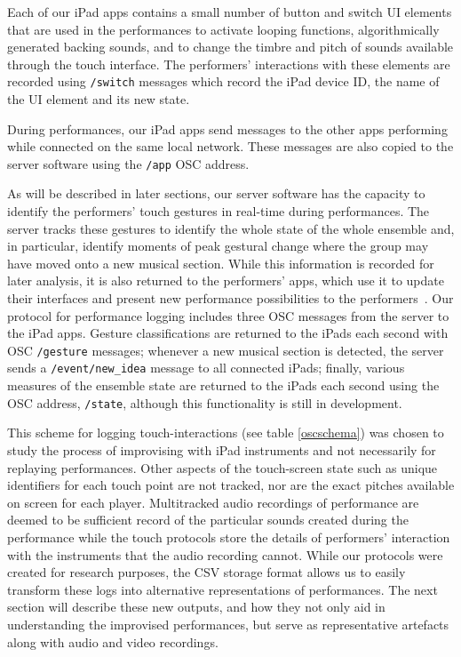 \documentclass[graybox]{svmult}
\begin{document}
Each of our iPad apps contains a small number of button and switch UI
elements that are used in the performances to activate looping
functions, algorithmically generated backing sounds, and to change the
timbre and pitch of sounds available through the touch interface. The
performers' interactions with these elements are recorded using
\texttt{/switch} messages which record the iPad device ID,
the name of the UI element and its new state.

During performances, our iPad apps send messages to the other apps
performing while connected on the same local network. These messages
are also copied to the server software using the
\texttt{/app} OSC address.

As will be described in later sections, our server software has the
capacity to identify the performers' touch gestures in real-time
during performances. The server tracks these gestures to identify the
whole state of the whole ensemble and, in particular, identify moments
of peak gestural change where the group may have moved onto a new
musical section. While this information is recorded for later
analysis, it is also returned to the performers' apps, which use it to
update their interfaces and present new performance possibilities to
the performers~\cite{Martin:2015jk}. Our protocol for performance
logging includes three OSC messages from the server to the iPad apps.
Gesture classifications are returned to the iPads each second with OSC
\texttt{/gesture} messages; whenever a new musical section is
detected, the server sends a \texttt{/event/new\_idea} message to all
connected iPads; finally, various measures of the ensemble state are
returned to the iPads each second using the OSC address,
\texttt{/state}, although this functionality is still in development.

This scheme for logging touch-interactions (see table \ref{oscschema})
was chosen to study the process of improvising with iPad instruments
and not necessarily for replaying performances. Other aspects of the
touch-screen state such as unique identifiers for each touch point are
not tracked, nor are the exact pitches available on screen for each
player. Multitracked audio recordings of performance are deemed to be
sufficient record of the particular sounds created during the
performance while the touch protocols store the details of performers'
interaction with the instruments that the audio recording cannot.
While our protocols were created for research purposes, the CSV
storage format allows us to easily transform these logs into
alternative representations of performances.
The next section will describe these new outputs, and how they not
only aid in understanding the improvised performances, but serve as
representative artefacts along with audio and video recordings.
\end{document}
